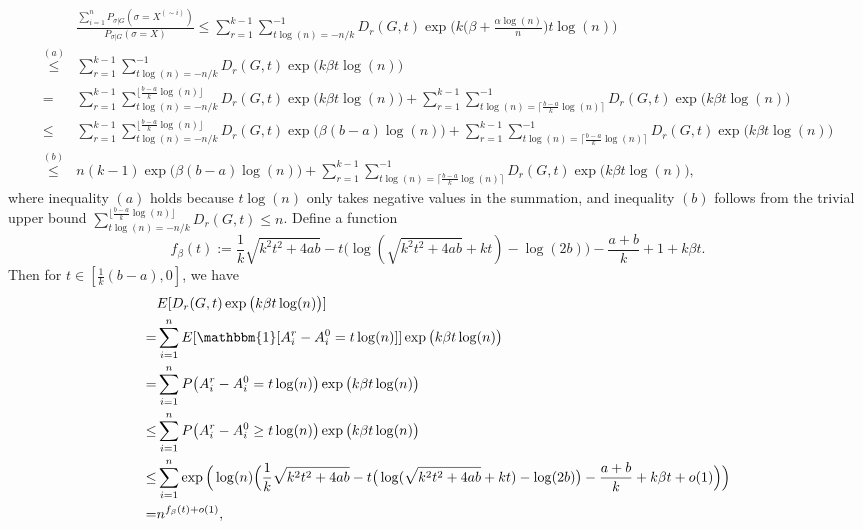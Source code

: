 \documentclass{article}
\begin{document}
\begin{equation} \label{eq:lq}
\begin{aligned}
& \frac{\sum_{i=1}^n P_{\sigma|G}(\sigma=X^{(\sim i)} )}
{P_{\sigma|G}(\sigma=X)}
\le \sum_{r=1}^{k-1}\sum_{t\log(n)=-n/k}^{-1}
D_r(G,t) \exp\Big(k\big(\beta+\frac{\alpha\log(n)}{n} \big) t \log(n) \Big)   \\
\overset{(a)}{\le} & \sum_{r=1}^{k-1}\sum_{t\log(n)=-n/k}^{-1}
D_r(G,t) \exp\big(k\beta t \log(n) \big) \\
= & \sum_{r=1}^{k-1}\sum_{t\log(n)=-n/k}^{\lfloor\frac{b-a}{k}\log(n) \rfloor} D_r(G,t)
\exp\big(k\beta t \log(n) \big)  +  \sum_{r=1}^{k-1}\sum_{t\log(n)=\lceil\frac{b-a}{k}\log(n) \rceil}^{-1} D_r(G,t)
\exp\big(k\beta t \log(n) \big) \\
\le &  \sum_{r=1}^{k-1}\sum_{t\log(n)=-n/k}^{\lfloor\frac{b-a}{k}\log(n) \rfloor} D_r(G,t)
\exp\big(\beta(b-a)\log(n) \big)  +  \sum_{r=1}^{k-1}\sum_{t\log(n)=\lceil\frac{b-a}{k}\log(n) \rceil}^{-1} D_r(G,t)
\exp\big(k\beta t \log(n) \big)  \\
\overset{(b)}{\le} & n(k-1)
\exp\big(\beta(b-a)\log(n) \big)  + \sum_{r=1}^{k-1}\sum_{t\log(n)=\lceil\frac{b-a}{k}\log(n) \rceil}^{-1} D_r(G,t)
\exp\big(k\beta t \log(n) \big) ,
\end{aligned}
\end{equation}
where inequality $(a)$ holds because $t\log(n)$ only takes negative values in the summation, and inequality $(b)$ follows from the trivial upper bound
$\sum_{t\log(n)=-n/k}^{\lfloor\frac{b-a}{k}\log(n) \rfloor} D_r(G,t)\le n$.
Define a function
\begin{equation} \label{eq:gt}
f_{\beta}(t):=\frac{1}{k}\sqrt{k^2t^2+4ab} -t\big(\log(\sqrt{k^2t^2+4ab}+kt)-\log(2b) \big) -\frac{a+b}{k} +1 +k\beta t.
\end{equation}
Then for $t\in [\frac{1}{k}(b-a), 0]$, we have 
\begin{align*}
& E[D_r(G, t)
\exp\big(k\beta t \log(n) \big)] \\
= & \sum_{i=1}^n E[\mathbbm{1}[A^r_i-A^0_i =t \log(n)]] \exp\big(k\beta t \log(n) \big) \\
= & \sum_{i=1}^n P\big(A^r_i-A^0_i=t \log(n) \big) \exp\big(k\beta t \log(n) \big) \\
\le & \sum_{i=1}^n P\big(A^r_i-A^0_i \ge t \log(n) \big) \exp\big(k\beta t \log(n) \big) \\
\le &  \sum_{i=1}^n \exp\Big(\log(n)
\Big(\frac{1}{k}\sqrt{k^2t^2+4ab} -t\big(\log(\sqrt{k^2t^2+4ab}+kt)-\log(2b) \big) -\frac{a+b}{k} +k\beta t +o(1)\Big)\Big) \\
= &  n^{f_{\beta}(t) +o(1)} ,
\end{align*}
\end{document}
